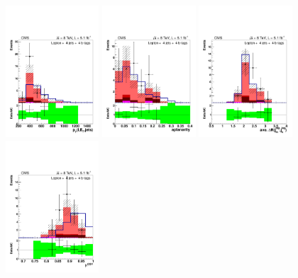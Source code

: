 \begin{figure}[hbtp]
 \begin{center}
   \includegraphics[width=0.31\textwidth]{Figures/Analysis_1_Diagrams/d2MCPlots_all_sum_pt_incl_met_cut7_j4_t4_Combined_HtWgt.pdf}
   \includegraphics[width=0.31\textwidth]{Figures/Analysis_1_Diagrams/d2MCPlots_aplanarity_cut7_j4_t4_Combined_HtWgt.pdf}
   \includegraphics[width=0.31\textwidth]{Figures/Analysis_1_Diagrams/d2MCPlots_avg_dr_tagged_jets_cut7_j4_t4_Combined_HtWgt.pdf}
   \includegraphics[width=0.31\textwidth]{Figures/Analysis_1_Diagrams/d2MCPlots_avg_btag_disc_btags_cut7_j4_t4_Combined_HtWgt.pdf}

\end{center}
\end{figure}
